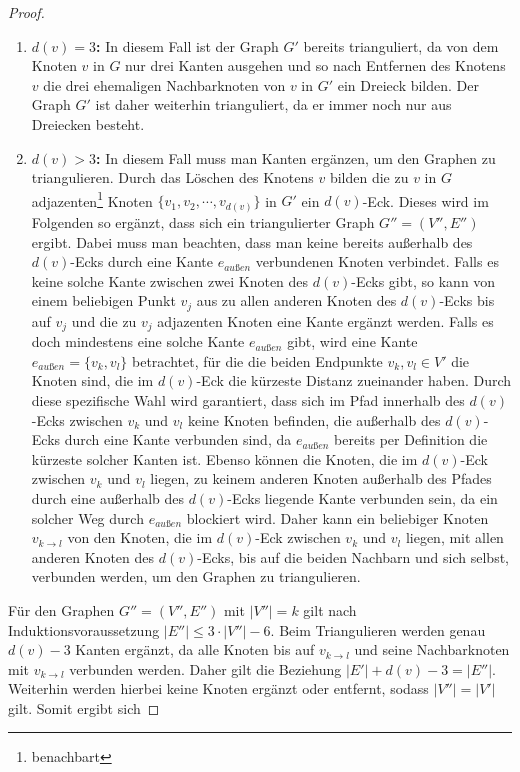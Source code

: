 \begin{proof}
\begin{enumerate}
\item \textbf{$d(v)=3$: } In diesem Fall ist der Graph $G'$ bereits trianguliert, da von dem Knoten $v$ in $G$ nur drei Kanten ausgehen und so nach Entfernen des Knotens $v$ die drei ehemaligen Nachbarknoten von $v$ in $G'$ ein Dreieck bilden. Der Graph $G'$ ist daher weiterhin trianguliert, da er immer noch nur aus Dreiecken besteht.
\item \textbf{$d(v)>3$: } In diesem Fall muss man Kanten ergänzen, um den Graphen zu triangulieren. Durch das Löschen des Knotens $v$ bilden die zu $v$ in $G$ adjazenten\footnote{benachbart} Knoten $\{v_1, v_2, \cdots, v_{d(v)}\}$ in $G'$ ein $d(v)$-Eck. Dieses wird im Folgenden so ergänzt, dass sich ein triangulierter Graph $G''=(V'',E'')$ ergibt. Dabei muss man beachten, dass man keine bereits außerhalb des $d(v)$-Ecks durch eine Kante $e_{außen}$ verbundenen Knoten verbindet. Falls es keine solche Kante zwischen zwei Knoten des $d(v)$-Ecks gibt, so kann von einem beliebigen Punkt $v_j$ aus zu allen anderen Knoten des $d(v)$-Ecks bis auf $v_j$ und die zu $v_j$ adjazenten Knoten eine Kante ergänzt werden. Falls es doch mindestens eine solche Kante $e_{außen}$ gibt, wird eine Kante $e_{außen}=\{v_k,v_l\}$ betrachtet, für die die beiden Endpunkte $v_k, v_l\in V'$ die Knoten sind, die im $d(v)$-Eck die kürzeste Distanz zueinander haben. Durch diese spezifische Wahl wird garantiert, dass sich im Pfad innerhalb des $d(v)$-Ecks zwischen $v_k$ und $v_l$ keine Knoten befinden, die außerhalb des $d(v)$-Ecks durch eine Kante verbunden sind, da $e_{außen}$ bereits per Definition die kürzeste solcher Kanten ist. Ebenso können die Knoten, die im $d(v)$-Eck zwischen $v_k$ und $v_l$ liegen, zu keinem anderen Knoten außerhalb des Pfades durch eine außerhalb des $d(v)$-Ecks liegende Kante verbunden sein, da ein solcher Weg durch $e_{außen}$ blockiert wird. Daher kann ein beliebiger Knoten $v_{k\rightarrow l}$ von den Knoten, die im $d(v)$-Eck zwischen $v_k$ und $v_l$ liegen, mit allen anderen Knoten des $d(v)$-Ecks, bis auf die beiden Nachbarn und sich selbst, verbunden werden, um den Graphen zu triangulieren.  
\end{enumerate}
Für den Graphen $G''=(V'',E'')$ mit $|V''|=k$ gilt nach Induktionsvoraussetzung $|E''|\leq 3\cdot |V''|-6 $.
Beim Triangulieren werden genau $d(v)-3$ Kanten ergänzt, da alle Knoten bis auf $v_{k\rightarrow l}$  und seine Nachbarknoten mit $v_{k\rightarrow l}$ verbunden werden. Daher gilt die Beziehung $|E'|+d(v)-3=|E''|$. Weiterhin werden hierbei keine Knoten ergänzt oder entfernt, sodass $|V''|=|V'|$ gilt. Somit ergibt sich

\end{proof}
